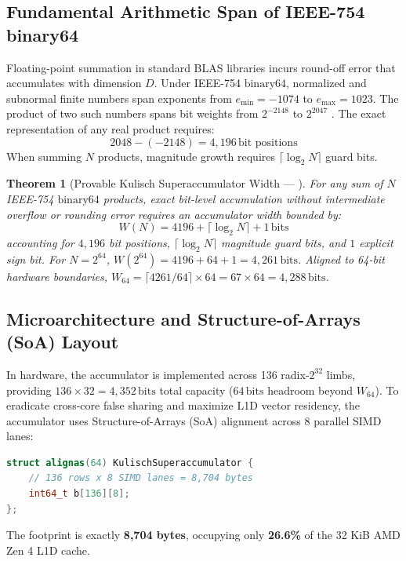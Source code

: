 \documentclass[journal,10pt,compsoc]{IEEEtran}
\theoremstyle{plain}
\newtheorem{theorem}{Theorem}
\theoremstyle{definition}
\begin{document}
\subsection{Fundamental Arithmetic Span of IEEE-754 binary64}
Floating-point summation in standard BLAS libraries incurs round-off error that accumulates with dimension $D$. Under IEEE-754 $\mathrm{binary64}$, normalized and subnormal finite numbers span exponents from $e_{\min} = -1074$ to $e_{\max} = 1023$. The product of two such numbers spans bit weights from $2^{-2148}$ to $2^{2047}$ \cite{kulisch2002advanced, kulisch2013computer}.
The exact representation of any real product requires:
\begin{equation}
\label{eq:span}
2048 - (-2148) = 4{,}196\,\text{bit positions}
\end{equation}
When summing $N$ products, magnitude growth requires $\lceil \log_2 N \rceil$ guard bits.

\begin{theorem}[Provable Kulisch Superaccumulator Width --- \label{thm:polydim_kulisch_width}]
For any sum of $N$ IEEE-754 $\mathrm{binary64}$ products, exact bit-level accumulation without intermediate overflow or rounding error requires an accumulator width bounded by:
\begin{equation}
\label{eq:kulisch_bound}
W(N) = 4196 + \lceil \log_2 N \rceil + 1\,\text{bits}
\end{equation}
accounting for $4{,}196$ bit positions, $\lceil \log_2 N \rceil$ magnitude guard bits, and $1$ explicit sign bit. For $N = 2^{64}$, $W(2^{64}) = 4196 + 64 + 1 = 4{,}261\,\text{bits}$. Aligned to 64-bit hardware boundaries, $W_{64} = \lceil 4261 / 64 \rceil \times 64 = 67 \times 64 = 4{,}288\,\text{bits}$.
\end{theorem}

\subsection{Microarchitecture and Structure-of-Arrays (SoA) Layout}
In hardware, the accumulator is implemented across 136 radix-$2^{32}$ limbs, providing $136 \times 32 = 4{,}352\,\text{bits}$ total capacity ($64\,\text{bits}$ headroom beyond $W_{64}$). To eradicate cross-core false sharing and maximize L1D vector residency, the accumulator uses Structure-of-Arrays (SoA) alignment across 8 parallel SIMD lanes:
\begin{lstlisting}[language=C++,caption={Kulisch SoA Layout in C++20}]
struct alignas(64) KulischSuperaccumulator {
    // 136 rows x 8 SIMD lanes = 8,704 bytes
    int64_t b[136][8];
};
\end{lstlisting}
The footprint is exactly \textbf{8,704 bytes}, occupying only \textbf{26.6\%} of the 32 KiB AMD Zen 4 L1D cache.
\end{document}
